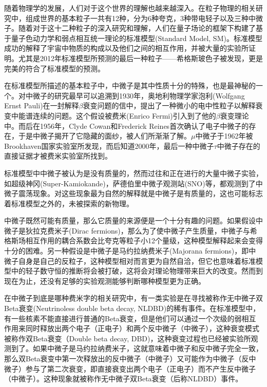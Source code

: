 

随着物理学的发展，人们对于这个世界的理解也越来越深入。在粒子物理的相关研究中，组成世界的基本粒子一共有12种，分为6种夸克，3种带电轻子以及三种中微子。随着对于这十二种粒子的深入研究和理解，人们在量子场论的框架下构建了基于量子色动力学和弱点相互统一理论的标准模型(Standard Model, SM)。标准模型成功的解释了宇宙中物质的构成以及他们之间的相互作用，并被大量的实验所证明。尤其是2012年标准模型所预测的最后一种粒子——希格斯玻色子被发现，更是完美的符合了标准模型的预测。

在标准模型所描述的基本粒子中，中微子是其中性质十分的特殊，也是最神秘的一个。对中微子的研究最早可以追溯到1930年，奥地利物理学家泡利(Wolfgang Ernst Pauli)在一封解释$\beta$衰变问题的信中，提出了一种微小的电中性粒子以解释衰变中能谱连续的问题。这个假设被费米(Enrico Fermi)引入到了他的$\beta$衰变理论中\supercite{wilson1968fermi}。而后在1956年，Clyde Cowan和Frederick Reines首次确认了电子中微子的存在\supercite{cowan1991detection}，于是中微子揭开了它隐藏的面纱，被人们所渐渐了解。$\mu$中微子于1962年被Brookhaven国家实验室所发现\supercite{danby1962observation}，而后知道2000年，最后一种中微子$\tau$中微子存在的直接证据才被费米实验室所找到\supercite{kodama2001observation}。

标准模型中中微子被认为是没有质量的，然而过往和正在进行的大量中微子实验，如超级神冈(Super-Kamiokande)\supercite{fukuda1998evidence}，萨德伯里中微子观测站(SNO)\supercite{ahmad2002direct}等，都观测到了中微子震荡现象。对这些现象最为自然的解释就是中微子是有质量的，这也可能标志着标准模型之外的，未被探索的新物理。

中微子既然可能有质量，那么它质量的来源便是一个十分有趣的问题。如果假设中微子是狄拉克费米子(Dirac fermions)，那么为了使中微子产生质量，中微子与希格斯场相互作用的耦合系数会比夸克等粒子小12个量级，这种模型解释起来会变得十分的困难。另一种假设是中微子是马约拉纳费米子(Majorana fermions)，即中微子自身是自己的反粒子，这种模型相对而言更为自然自洽，但它也意味着标准模型中的轻子数守恒的推断将会被打破，这将会对理论物理带来巨大的改变。然而到现在为止，还没有足够的实验观测能够判断哪种模型更为正确。

在中微子到底是哪种费米字的相关研究中，有一类实验是在寻找被称作无中微子双Beta衰变(Neutrinoless double beta decay, NLDBD)\supercite{avignone2008double}的稀有事件。在标准模型中，有一些核素不能直接进行普通的Beta衰变，但是他们可以通过一个次级的弱相互作用来同时释放出两个电子（正电子）和两个反中微子（中微子），这种衰变模式被称作双Beta衰变（Double beta decay, DBD)，这种衰变过程也已经被实验所观测到了。如果中微子是马约拉纳费米子，这就意味着中微子和反中微子完全一致，那么双Beta衰变中第一次释放出的反中微子（中微子）又可能作为中微子（反中微子）参与了第二次衰变，即直接衰变出两个电子（正电子）而不产生反中微子（中微子）。这种现象就被称作无中微子双Beta衰变（后称NLDBD）事件。

